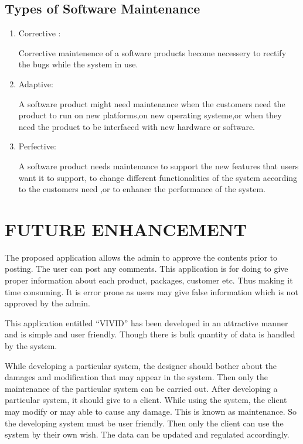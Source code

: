 \documentclass[a4paper,12pt]{article}
\begin{document}
\subsection{Types of Software Maintenance}\vspace{2mm}
\begin{enumerate}
\item{Corrective : }\par
Corrective maintenence of a software products become necessery to rectify the bugs while the system in use.
\item{Adaptive:}\par
A software product might need maintenance when the customers need the product to run on new platforms,on new operating systeme,or when they need the product to be interfaced with new hardware or software.
\item{Perfective:} \par
A  software product needs maintenance to support the new features that users want it to support, to change different functionalities of the system according to the customers need ,or to enhance the performance of the system.
\end{enumerate}
\newpage
\section{FUTURE ENHANCEMENT}\vspace{5mm}
The proposed application allows the admin to approve the contents prior to posting. The user can post any comments. 
This application is for doing to give proper information about each product, packages, customer etc. Thus making it time consuming. It is error prone as users may give false information which is not approved by the admin.\par\vspace{2mm}
This application entitled “VIVID” has been developed in an attractive manner and is simple and user friendly. Though there is bulk quantity of data is handled by the system.
\par\vspace{2mm}
While developing a particular system, the designer should bother about the damages and modification that may appear in the system. Then only the maintenance of the particular system can be carried out. After developing a particular system, it should give to a client. While using the system, the client may modify or may able to cause any damage. This is known as maintenance. 
So the developing system must be user friendly. Then only the client can use the system by their own wish. The data can be updated and regulated accordingly.
\end{document}
